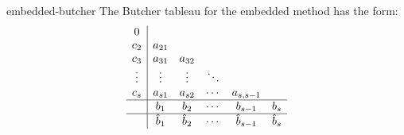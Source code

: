 \begin{Definition}{embedded-butcher}
  The Butcher tableau for the embedded method has the form:
  \begin{gather*}
    \begin{array}{c|ccccc}
      0 & \\
      c_2 & a_{21} \\
      c_3 & a_{31} & a_{32} \\
      \vdots & \vdots & \vdots & \ddots \\
      c_s & a_{s1} & a_{s2} & \cdots & a_{s,s-1} \\
      \hline
      & b_1 & b_2 & \cdots & b_{s-1} & b_s \\
      \hline
      & \hat {b}_1 & \hat {b}_2 & \cdots & \hat {b}_{s-1} & \hat {b}_s
    \end{array}  
  \end{gather*}  
\end{Definition}

